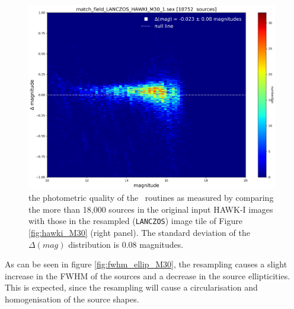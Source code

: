 \begin{figure}[H]
\centering
\includegraphics[width=11cm]{figures/match_field_LANCZOS_HAWKI_M30_1_mag_scatter_plot.png}
\caption[]
	{\footnotesize  the photometric quality of the \hdrlresample\ routines as measured by comparing the more than 18,000 sources in the original input HAWK-I images
	with those in the resampled ({\tt LANCZOS}) image tile of Figure \ref{fig:hawki_M30} (right panel).
	The standard deviation of the $\Delta(mag)$  distribution is 0.08 magnitudes. 	
	}
	\label{fig:mag_M30}
\end{figure}

As can be seen in figure \ref{fig:fwhm_ellip_M30}, the resampling causes a slight increase in the FWHM of the sources and a decrease in the source ellipticities.
This is expected, since the resampling will cause a circularisation and homogenisation of the source shapes.


